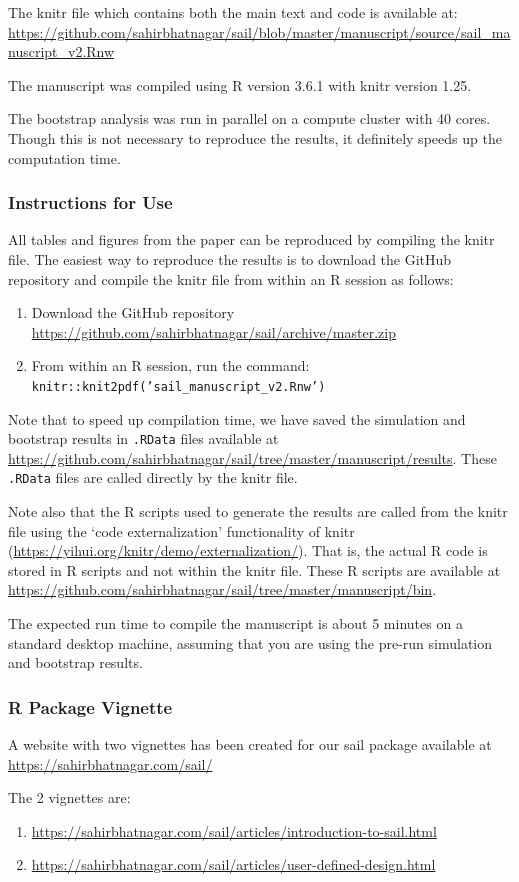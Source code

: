 \documentclass[a4paper,fleqn]{cas-sc}
\begin{document}
The knitr file which contains both the main text and code is available at: \url{https://github.com/sahirbhatnagar/sail/blob/master/manuscript/source/sail_manuscript_v2.Rnw}

The manuscript was compiled using R version 3.6.1 with knitr version 1.25.

The bootstrap analysis was run in parallel on a compute cluster with 40 cores. Though this is not necessary to reproduce the results, it definitely speeds up the computation time.  

\subsubsection{Instructions for Use}

All tables and figures from the paper can be reproduced by compiling the knitr file. The easiest way to reproduce the results is to download the GitHub repository and compile the knitr file from within an R session as follows:

\begin{enumerate}
	\item Download the GitHub repository \url{https://github.com/sahirbhatnagar/sail/archive/master.zip}
	\item From within an R session, run the command: \texttt{knitr::knit2pdf('sail\_manuscript\_v2.Rnw')}
\end{enumerate}

Note that to speed up compilation time, we have saved the simulation and bootstrap results in \texttt{.RData} files available at \url{https://github.com/sahirbhatnagar/sail/tree/master/manuscript/results}. These \texttt{.RData} files are called directly by the knitr file. 

Note also that the R scripts used to generate the results are called from the knitr file using the `code externalization' functionality of knitr (\url{https://yihui.org/knitr/demo/externalization/}). That is, the actual R code is stored in R scripts and not within the knitr file. These R scripts are available at \url{https://github.com/sahirbhatnagar/sail/tree/master/manuscript/bin}. 

The expected run time to compile the manuscript is about 5 minutes on a standard desktop machine, assuming that you are using the pre-run simulation and bootstrap results. 

\subsubsection{R Package Vignette}
A website with two vignettes has been created for our sail package available at \url{https://sahirbhatnagar.com/sail/}

The 2 vignettes are:

\begin{enumerate}
	\item \url{https://sahirbhatnagar.com/sail/articles/introduction-to-sail.html}
	\item \url{https://sahirbhatnagar.com/sail/articles/user-defined-design.html}
\end{enumerate}
\end{document}
